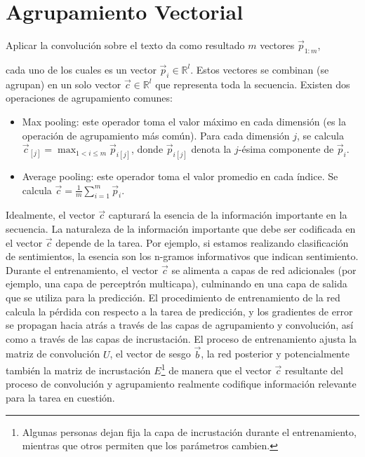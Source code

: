 \section{Agrupamiento Vectorial}

Aplicar la convolución sobre el texto da como resultado $m$ vectores $\vec{p}_{1:m}$,

cada uno de los cuales es un vector $\vec{p}_i \in \mathbb{R}^l$. Estos vectores se combinan (se agrupan) en un solo vector $\vec{c} \in \mathbb{R}^l$ que representa toda la secuencia. Existen dos operaciones de agrupamiento comunes:

\begin{itemize}
  \item Max pooling: este operador toma el valor máximo en cada dimensión (es la operación de agrupamiento más común). Para cada dimensión $j$, se calcula $\vec{c}_{[j]} = \max_{1 < i \leq m} \vec{p}_{i[j]}$, donde $\vec{p}_{i[j]}$ denota la $j$-ésima componente de $\vec{p}_i$.

  \item Average pooling: este operador toma el valor promedio en cada índice. Se calcula $\vec{c} = \frac{1}{m} \sum_{i=1}^{m} \vec{p}_i$.
\end{itemize}

Idealmente, el vector $\vec{c}$ capturará la esencia de la información importante en la secuencia. La naturaleza de la información importante que debe ser codificada en el vector $\vec{c}$ depende de la tarea. Por ejemplo, si estamos realizando clasificación de sentimientos, la esencia son los n-gramos informativos que indican sentimiento. Durante el entrenamiento, el vector $\vec{c}$ se alimenta a capas de red adicionales (por ejemplo, una capa de perceptrón multicapa), culminando en una capa de salida que se utiliza para la predicción. El procedimiento de entrenamiento de la red calcula la pérdida con respecto a la tarea de predicción, y los gradientes de error se propagan hacia atrás a través de las capas de agrupamiento y convolución, así como a través de las capas de incrustación. El proceso de entrenamiento ajusta la matriz de convolución $U$, el vector de sesgo $\vec{b}$, la red posterior y potencialmente también la matriz de incrustación $E$\footnote{Algunas personas dejan fija la capa de incrustación durante el entrenamiento, mientras que otros permiten que los parámetros cambien.} de manera que el vector $\vec{c}$ resultante del proceso de convolución y agrupamiento realmente codifique información relevante para la tarea en cuestión.

